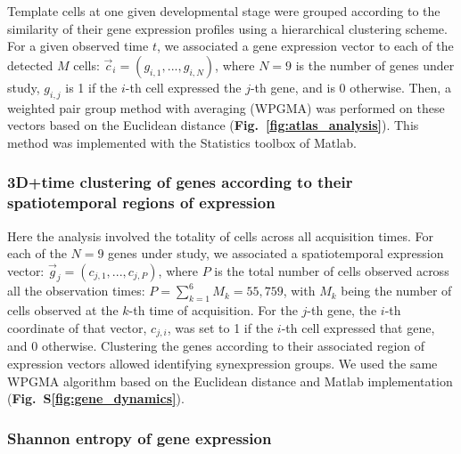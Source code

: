 Template cells at one given developmental stage were grouped according to the similarity of their gene expression profiles using a hierarchical clustering scheme. For a given observed time $t$, we associated a gene expression vector to each of the detected $M$ cells: $\vec{c}_i = (g_{i,1}, ..., g_{i,N})$, where $N=9$ is the number of genes under study, $g_{i,j}$ is 1 if the $i$-th cell expressed the $j$-th gene, and is 0 otherwise. Then, a weighted pair group method with averaging (WPGMA) was performed on these vectors based on the Euclidean distance (\textbf{Fig.~\ref{fig:atlas_analysis}}). This method was implemented with the Statistics toolbox of Matlab.



\subsubsection*{\textbf{3D+time clustering of genes according to their spatiotemporal regions of expression}}



Here the analysis involved the totality of cells across all acquisition times. For each of the $N=9$ genes under study, we associated a spatiotemporal expression vector: $\vec{g}_j = (c_{j,1}, ..., c_{j,P})$, where $P$ is the total number of cells observed across all the observation times: $P=\sum_{k=1}^{6} M_{k} = 55,759$, with $M_k$ being the number of cells observed at the $k$-th time of acquisition. For the $j$-th gene, the $i$-th coordinate of that vector, $c_{j,i}$, was set to 1 if the $i$-th cell expressed that gene, and 0 otherwise. Clustering the genes according to their associated region of expression vectors allowed identifying synexpression groups\cite{niehrs1999synexpression}. We used the same WPGMA algorithm based on the Euclidean distance and Matlab implementation (\textbf{Fig.~S\ref{fig:gene_dynamics}}).



\subsubsection*{\textbf{Shannon entropy of gene expression}}



